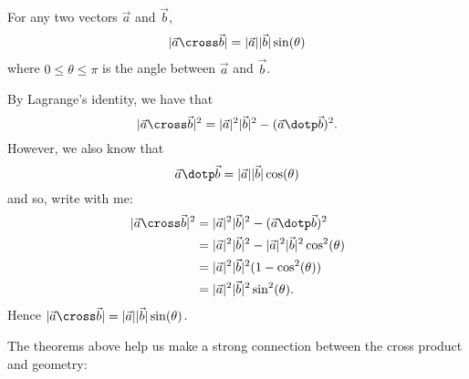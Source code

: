 \documentclass{ximera}
\begin{document}
\begin{theorem}
  For any two vectors $\vec{a}$ and $\vec{b}$,
  \[
  |\vec{a} \cross \vec{b}| = |\vec{a}||\vec{b}|\sin(\theta)
  \]
  where $0\le \theta\le\pi$ is the angle between $\vec{a}$ and
  $\vec{b}$.
  \begin{explanation}
    By Lagrange's identity, we have that
    \[
    |\vec{a}\cross\vec{b}|^2 = |\vec{a}|^2 |\vec{b}|^2 - (\vec{a}\dotp\vec{b})^2.
    \]
    However, we also know that
    \[
    \vec{a} \dotp\vec{b} = |\vec{a}| |\vec{b}|\cos(\theta)
    \]
    and so, write with me:
    \begin{align*}
      |\vec{a}\cross\vec{b}|^2 &= |\vec{a}|^2 |\vec{b}|^2 - (\vec{a}\dotp\vec{b})^2\\
      &= |\vec{a}|^2 |\vec{b}|^2 - |\vec{a}|^2 |\vec{b}|^2\cos^2(\theta)\\
      &= |\vec{a}|^2 |\vec{b}|^2(1 - \cos^2(\theta))\\
      &= |\vec{a}|^2 |\vec{b}|^2\sin^2(\theta).
    \end{align*}
    Hence $|\vec{a} \cross \vec{b}| = |\vec{a}||\vec{b}|\sin(\theta)$.
  \end{explanation}
\end{theorem}

The theorems above help us make a strong connection between the cross
product and geometry:
\end{document}
